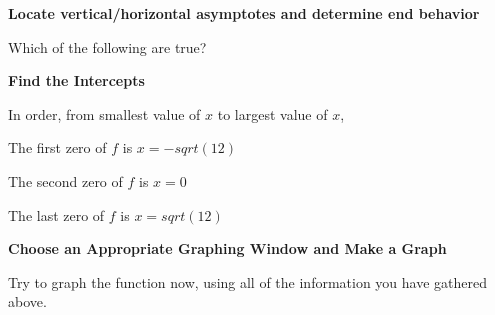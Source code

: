 \documentclass{ximera}
\begin{document}
 \textbf{Locate vertical/horizontal asymptotes and determine end behavior}
 
 \begin{question}
 Which of the following are true?
 
 \begin{multipleChoice}
    \end{multipleChoice}
    \end{question}
    
    
  \textbf{Find the Intercepts}
  
 In order, from smallest value of $x$ to largest value of $x$, 
 
 \begin{question}
 	The first zero of $f$ is $x=-sqrt(12)$
 \end{question}
 
  \begin{question}
 	The second zero of $f$ is $x=0$
 \end{question}
 
  \begin{question}
 	The last zero of $f$ is $x=sqrt(12)$
 \end{question}
 
  
  \textbf{Choose an Appropriate Graphing Window and Make a Graph}
  
  Try to graph the function now, using all of the information you have gathered above.  
  
\end{document}
